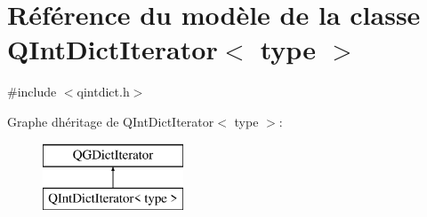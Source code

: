 \hypertarget{class_q_int_dict_iterator}{}\section{Référence du modèle de la classe Q\+Int\+Dict\+Iterator$<$ type $>$}
\label{class_q_int_dict_iterator}


{\ttfamily \#include $<$qintdict.\+h$>$}

Graphe d\textquotesingle{}héritage de Q\+Int\+Dict\+Iterator$<$ type $>$\+:\begin{figure}[H]
\begin{center}
\leavevmode
\includegraphics[height=2.000000cm]{class_q_int_dict_iterator}
\end{center}
\end{figure}
